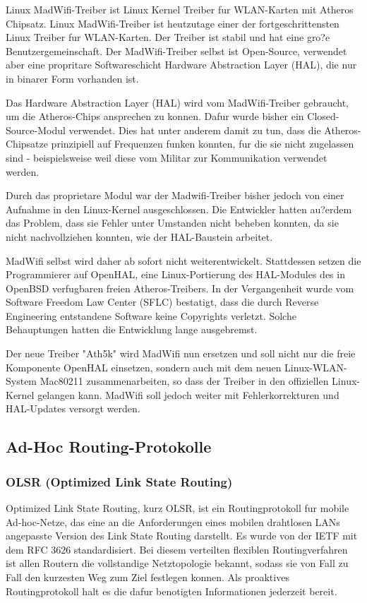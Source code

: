 Linux MadWifi-Treiber ist Linux Kernel Treiber fur WLAN-Karten mit Atheros Chipsatz. Linux MadWifi-Treiber ist heutzutage einer der fortgeschrittensten Linux Treiber fur WLAN-Karten. Der Treiber ist stabil und hat eine gro?e Benutzergemeinschaft. Der MadWifi-Treiber selbst ist Open-Source, verwendet aber eine propritare Softwareschicht Hardware Abstraction Layer (HAL), die nur in binarer Form vorhanden ist. 

Das Hardware Abstraction Layer (HAL) wird vom MadWifi-Treiber gebraucht, um die Atheros-Chips ansprechen zu konnen. Dafur wurde bisher ein Closed-Source-Modul verwendet. Dies hat unter anderem damit zu tun, dass die Atheros-Chipsatze prinzipiell auf Frequenzen funken konnten, fur die sie nicht zugelassen sind - beispielsweise weil diese vom Militar zur Kommunikation verwendet werden. 

Durch das proprietare Modul war der Madwifi-Treiber bisher jedoch von einer Aufnahme in den Linux-Kernel ausgeschlossen. Die Entwickler hatten au?erdem das Problem, dass sie Fehler unter Umstanden nicht beheben konnten, da sie nicht nachvollziehen konnten, wie der HAL-Baustein arbeitet. 

MadWifi selbst wird daher ab sofort nicht weiterentwickelt. Stattdessen setzen die Programmierer auf OpenHAL, eine Linux-Portierung des HAL-Modules des in OpenBSD verfugbaren freien Atheros-Treibers. In der Vergangenheit wurde vom Software Freedom Law Center (SFLC) bestatigt, dass die durch Reverse Engineering entstandene Software keine Copyrights verletzt. Solche Behauptungen hatten die Entwicklung lange ausgebremst. 

Der neue Treiber "Ath5k" wird MadWifi nun ersetzen und soll nicht nur die freie Komponente OpenHAL einsetzen, sondern auch mit dem neuen Linux-WLAN-System Mac80211 zusammenarbeiten, so dass der Treiber in den offiziellen Linux-Kernel gelangen kann. MadWifi soll jedoch weiter mit Fehlerkorrekturen und HAL-Updates versorgt werden. 

\subsection{Ad-Hoc Routing-Protokolle}

\subsubsection{OLSR (Optimized Link State Routing)}

Optimized Link State Routing, kurz OLSR, ist ein Routingprotokoll fur mobile Ad-hoc-Netze, das eine an die Anforderungen eines mobilen drahtlosen LANs angepasste Version des Link State Routing darstellt. Es wurde von der IETF mit dem RFC 3626 standardisiert. Bei diesem verteilten flexiblen Routingverfahren ist allen Routern die vollstandige Netztopologie bekannt, sodass sie von Fall zu Fall den kurzesten Weg zum Ziel festlegen konnen. Als proaktives Routingprotokoll halt es die dafur benotigten Informationen jederzeit bereit. 

